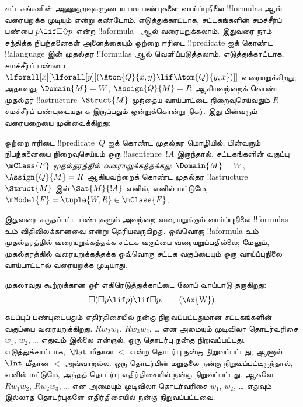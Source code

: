 \documentclass[../../../include/open-logic-section]{subfiles}
\begin{document}


சட்டகங்களின் அணுகுறவுகளுடைய பல பண்புகளை வாய்ப்புநிலை !!{formula}s ஆல்
வரையறுக்க முடியும் என்று கண்டோம். எடுத்துக்காட்டாக, சட்டகங்களின் சமச்சீர்ப்
பண்பை $p \lif \Box\Diamond p$ என்ற !!a{formula}~ ஆல் வரையறுக்கலாம்.
இதுவரை நாம் சந்தித்த நிபந்தனைகள் அனைத்தையும் ஒற்றை ஈரிடை
!!{predicate} ஐக் கொண்ட !!a{language} இன் முதல்தர !!{formula}s ஆல்
வெளிப்படுத்தலாம். எடுத்துக்காட்டாக, சமச்சீர்ப் பண்பை
$\lforall[x][\lforall[y][(\Atom{Q}{x,y} \lif \Atom{Q}{y, x})]]$ வரையறுக்கிறது;
அதாவது, $\Domain{M} = W$, $\Assign{Q}{M} = R$ ஆகியவற்றைக் கொண்ட முதல்தர
!!a{structure}~$\Struct{M}$ முந்தைய வாய்பாட்டை நிறைவுசெய்வதும் $R$
சமச்சீர்ப் பண்புடையதாக இருப்பதும் ஒன்றுக்கொன்று நிகர். இது பின்வரும்
வரையறையை முன்வைக்கிறது:

\begin{defn}
  ஒற்றை ஈரிடை !!{predicate}~$Q$ ஐக் கொண்ட முதல்தர மொழியில், பின்வரும்
  நிபந்தனையை நிறைவுசெய்யும் ஒரு !!a{sentence}~$!A$ இருந்தால்,
  சட்டகங்களின் வகுப்பு~$\mClass{F}$ \emph{முதல்தரத்தில் வரையறுக்கத்தக்கது}:
  $\Domain{M} = W$, $\Assign{Q}{M} = R$ ஆகியவற்றைக் கொண்ட முதல்தர
  !!a{structure}~$\Struct{M}$ இல் $\Sat{M}{!A}$ எனில், எனில் மட்டுமே,
  $\mModel{F} = \tuple{W, R} \in \mClass{F}$.
\end{defn}

இதுவரை கருதப்பட்ட பண்புகளும் அவற்றை வரையறுக்கும் வாய்ப்புநிலை
!!{formula}s உம் விதிவிலக்கானவை என்று தெரியவருகிறது. ஒவ்வொரு !!a{formula}
உம் முதல்தரத்தில் வரையறுக்கத்தக்க சட்டக வகுப்பை வரையறுப்பதில்லை; மேலும்,
முதல்தரத்தில் வரையறுக்கத்தக்க ஒவ்வொரு சட்டக வகுப்பையும் ஒரு வாய்ப்புநிலை
வாய்பாட்டால் வரையறுக்க முடியாது.

முதலாவது கூற்றுக்கான ஓர் எதிரெடுத்துக்காட்டை லோப் வாய்பாடு தருகிறது:
\begin{equation}
\Box(\Box p \lif p) \lif \Box p. \tag{\Ax{W}}
\end{equation}
கடப்புப் பண்புடையதும் எதிர்திசையில் நன்கு நிறுவப்பட்டதுமான சட்டகங்களின்
வகுப்பை  வரையறுக்கிறது. $Rw_2w_1$, $Rw_3w_2$, \dots{} என அமையும்
முடிவிலா தொடர்வரிசை $w_1$, $w_2$, \dots{} எதுவும் இல்லை என்றால், ஒரு
தொடர்பு நன்கு நிறுவப்பட்டது. எடுத்துக்காட்டாக,~$\Nat$ மீதான $<$ என்ற தொடர்பு
நன்கு நிறுவப்பட்டது; ஆனால்~$\Int$ மீதான $<$ அவ்வாறல்ல. ஒரு தொடர்பின்
மறுதலை நன்கு நிறுவப்பட்டிருந்தால், எனில் மட்டுமே, அந்தத் தொடர்பு
எதிர்திசையில் நன்கு நிறுவப்பட்டது. ஆகவே $Rw_1w_2$, $Rw_2w_3$, \dots{} என
அமையும் முடிவிலா தொடர்வரிசை $w_1$, $w_2$, \dots{} எதுவும் இல்லாத
தொடர்புகளே எதிர்திசையில் நன்கு நிறுவப்பட்டவை.
\end{document}
